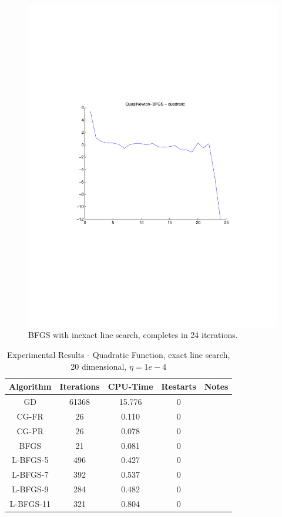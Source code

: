 \documentclass[12pt]{amsart}
\begin{document}
\begin{figure}[thpb]
\centering
\includegraphics[scale=0.80,clip=true,viewport=1in 3in 8in 8in]{images/quad-inexact/BFGS.pdf}
\caption{BFGS with inexact line search, completes in 24 iterations.}
\label{fig:BFGS-inexact}
\end{figure}


\begin{table}
\caption{Experimental Results - Quadratic Function, exact line search, 20 dimensional, $\eta=1e-4$}
\label{table_exact_quad}
\begin{center}
\begin{tabular}{|c||c||c||c||c|}
\hline
Algorithm & Iterations & CPU-Time & Restarts & Notes\\
\hline
GD & 61368 & 15.776 & 0 & \\
\hline
CG-FR & 26 & 0.110 & 0 & \\
\hline
CG-PR & 26 & 0.078 & 0 & \\
\hline
BFGS & 21 & 0.081& 0 & \\
\hline
L-BFGS-5 & 496 & 0.427 & 0 &\\
\hline
L-BFGS-7 & 392 & 0.537 & 0 &\\
\hline
L-BFGS-9 & 284 & 0.482 & 0 &\\
\hline
L-BFGS-11 & 321 & 0.804 & 0 &\\
\hline
\end{tabular}
\end{center}
\end{table}
\end{document}
